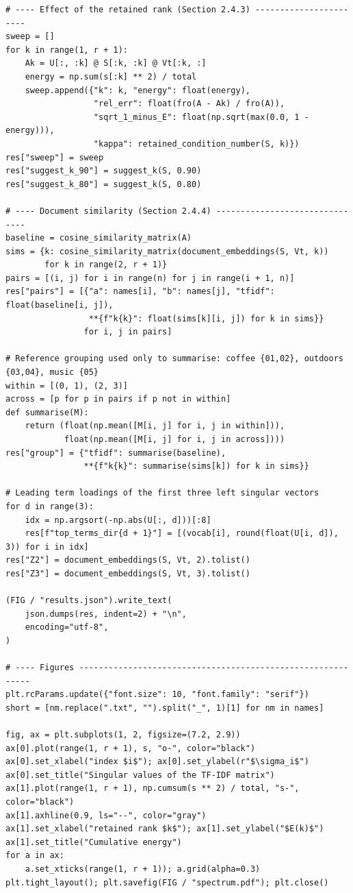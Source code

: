 \documentclass[12pt,a4paper]{report}
\theoremstyle{plain}
\theoremstyle{definition}
\theoremstyle{remark}
\theoremstyle{definition}
\begin{document}
\begin{lstlisting}
# ---- Effect of the retained rank (Section 2.4.3) -----------------------
sweep = []
for k in range(1, r + 1):
    Ak = U[:, :k] @ S[:k, :k] @ Vt[:k, :]
    energy = np.sum(s[:k] ** 2) / total
    sweep.append({"k": k, "energy": float(energy),
                  "rel_err": float(fro(A - Ak) / fro(A)),
                  "sqrt_1_minus_E": float(np.sqrt(max(0.0, 1 - energy))),
                  "kappa": retained_condition_number(S, k)})
res["sweep"] = sweep
res["suggest_k_90"] = suggest_k(S, 0.90)
res["suggest_k_80"] = suggest_k(S, 0.80)

# ---- Document similarity (Section 2.4.4) -------------------------------
baseline = cosine_similarity_matrix(A)
sims = {k: cosine_similarity_matrix(document_embeddings(S, Vt, k))
        for k in range(2, r + 1)}
pairs = [(i, j) for i in range(n) for j in range(i + 1, n)]
res["pairs"] = [{"a": names[i], "b": names[j], "tfidf": float(baseline[i, j]),
                 **{f"k{k}": float(sims[k][i, j]) for k in sims}}
                for i, j in pairs]

# Reference grouping used only to summarise: coffee {01,02}, outdoors {03,04}, music {05}
within = [(0, 1), (2, 3)]
across = [p for p in pairs if p not in within]
def summarise(M):
    return (float(np.mean([M[i, j] for i, j in within])),
            float(np.mean([M[i, j] for i, j in across])))
res["group"] = {"tfidf": summarise(baseline),
                **{f"k{k}": summarise(sims[k]) for k in sims}}

# Leading term loadings of the first three left singular vectors
for d in range(3):
    idx = np.argsort(-np.abs(U[:, d]))[:8]
    res[f"top_terms_dir{d + 1}"] = [(vocab[i], round(float(U[i, d]), 3)) for i in idx]
res["Z2"] = document_embeddings(S, Vt, 2).tolist()
res["Z3"] = document_embeddings(S, Vt, 3).tolist()

(FIG / "results.json").write_text(
    json.dumps(res, indent=2) + "\n",
    encoding="utf-8",
)

# ---- Figures ------------------------------------------------------------
plt.rcParams.update({"font.size": 10, "font.family": "serif"})
short = [nm.replace(".txt", "").split("_", 1)[1] for nm in names]

fig, ax = plt.subplots(1, 2, figsize=(7.2, 2.9))
ax[0].plot(range(1, r + 1), s, "o-", color="black")
ax[0].set_xlabel("index $i$"); ax[0].set_ylabel(r"$\sigma_i$")
ax[0].set_title("Singular values of the TF-IDF matrix")
ax[1].plot(range(1, r + 1), np.cumsum(s ** 2) / total, "s-", color="black")
ax[1].axhline(0.9, ls="--", color="gray")
ax[1].set_xlabel("retained rank $k$"); ax[1].set_ylabel("$E(k)$")
ax[1].set_title("Cumulative energy")
for a in ax:
    a.set_xticks(range(1, r + 1)); a.grid(alpha=0.3)
plt.tight_layout(); plt.savefig(FIG / "spectrum.pdf"); plt.close()


\end{lstlisting}
\end{document}
